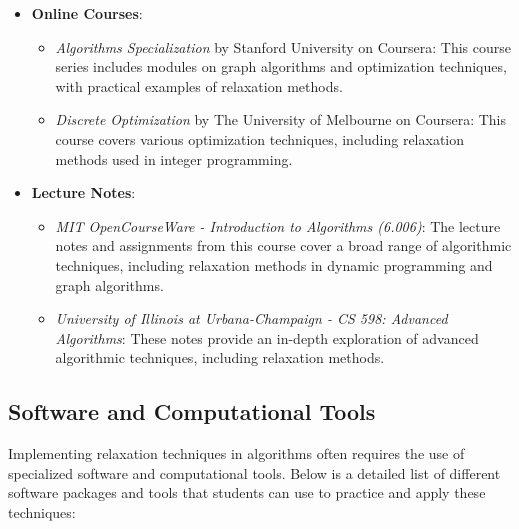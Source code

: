 \documentclass[12pt]{book} %
\begin{document}
\begin{itemize}
    \item \textbf{Online Courses}:
        \begin{itemize}
            \item \textit{Algorithms Specialization} by Stanford University on Coursera: This course series includes modules on graph algorithms and optimization techniques, with practical examples of relaxation methods.
            \item \textit{Discrete Optimization} by The University of Melbourne on Coursera: This course covers various optimization techniques, including relaxation methods used in integer programming.
        \end{itemize}
    \item \textbf{Lecture Notes}:
        \begin{itemize}
            \item \textit{MIT OpenCourseWare - Introduction to Algorithms (6.006)}: The lecture notes and assignments from this course cover a broad range of algorithmic techniques, including relaxation methods in dynamic programming and graph algorithms.
            \item \textit{University of Illinois at Urbana-Champaign - CS 598: Advanced Algorithms}: These notes provide an in-depth exploration of advanced algorithmic techniques, including relaxation methods.
        \end{itemize}
\end{itemize}

\subsection{Software and Computational Tools}
Implementing relaxation techniques in algorithms often requires the use of specialized software and computational tools. Below is a detailed list of different software packages and tools that students can use to practice and apply these techniques:
\end{document}

